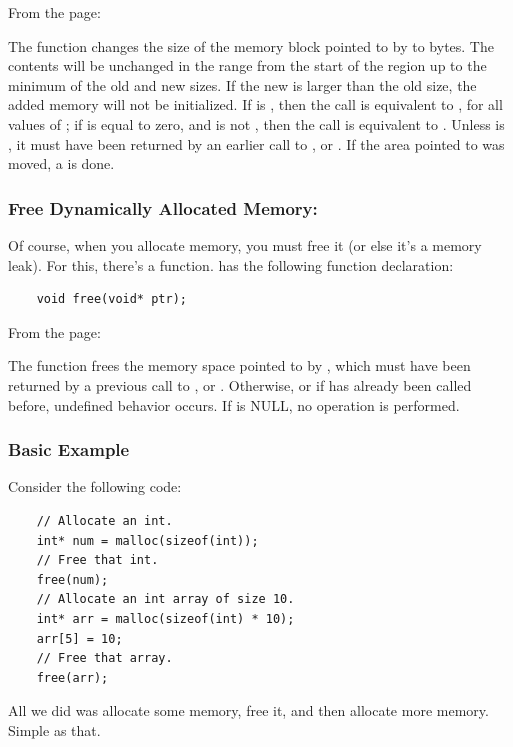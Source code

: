 \documentclass[letterpaper]{article}
\begin{document}
From the  page:
\begin{displayquote}
    The  function changes the size of the memory block pointed to by \underline{} to \underline{} bytes. The contents will be unchanged in the range from the start of the region up to the minimum of the old and new sizes. If the new \underline{} is larger than the old size, the added memory will not be initialized. If \underline{} is , then the call is equivalent to , for all values of \underline{}; if \underline{} is equal to zero, and \underline{} is not , then the call is equivalent to . Unless \underline{} is , it must have been returned by an earlier call to ,  or . If the area pointed to was moved, a  is done.
\end{displayquote}

\subsubsection{Free Dynamically Allocated Memory: }
Of course, when you allocate memory, you must free it (or else it's a memory leak). For this, there's a  function.  has the following function declaration:
\begin{verbatim}
    void free(void* ptr);
\end{verbatim}

From the  page:
\begin{displayquote}
    The  function frees the memory space pointed to by \underline{}, which must have been returned by a previous call to ,  or . Otherwise, or if  has already been called before, undefined behavior occurs. If \underline{} is NULL, no operation is performed.
\end{displayquote}

\subsubsection{Basic Example}
Consider the following code:
\begin{verbatim}
    // Allocate an int.
    int* num = malloc(sizeof(int));
    // Free that int.
    free(num); 
    // Allocate an int array of size 10.
    int* arr = malloc(sizeof(int) * 10);
    arr[5] = 10;
    // Free that array.
    free(arr);
\end{verbatim}
All we did was allocate some memory, free it, and then allocate more memory. Simple as that.
\end{document}
